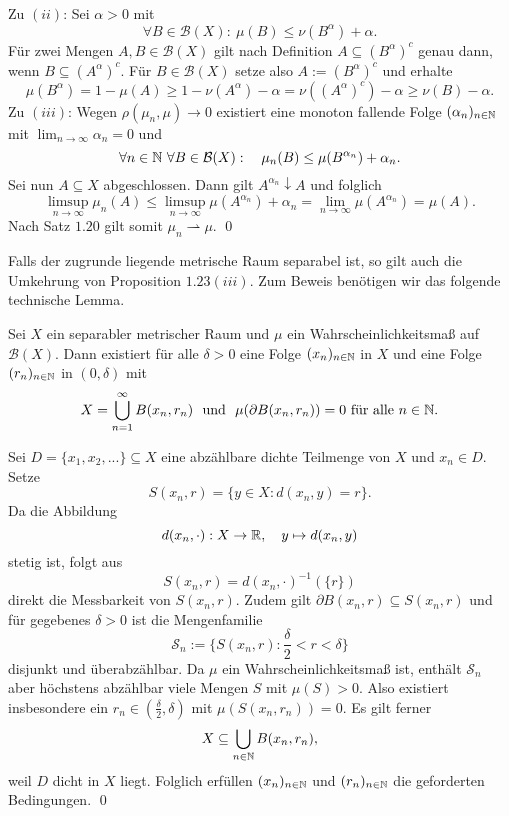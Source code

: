 \begin{proof*}
$$    $$
    Zu $(ii)$: Sei $\alpha > 0$ mit 
    $$
        \forall B \in \mathcal{B}(X): \ \mu(B) \leq \nu(B^{\alpha}) + \alpha.
    $$
    Für zwei Mengen $A,B \in \mathcal{B}(X)$ gilt nach Definition $A \subseteq (B^{\alpha})^c$ genau dann, wenn $B \subseteq (A^{\alpha})^c$. 
    Für $B \in \mathcal{B}(X)$ setze also $A:=(B^{\alpha})^c$ und erhalte 
    $$ 
        \mu(B^{\alpha}) = 1 - \mu(A) \geq 1 - \nu(A^{\alpha}) - \alpha = \nu((A^{\alpha})^c) - \alpha \geq \nu(B) - \alpha. 
    $$
    Zu $(iii)$: Wegen $\rho(\mu_n, \mu) \to 0$ existiert eine monoton fallende Folge $(\alpha_n)_{n \in \mathbb{N}}$ mit $\lim_{n \to \infty}\alpha_n = 0$ und 
    $$
        \forall n \in \mathbb{N} \ \forall B \in \mathcal{B}(X): \quad \mu_n(B) \leq \mu(B^{\alpha_n}) + \alpha_n. 
    $$
    Sei nun $A \subseteq X$ abgeschlossen. Dann gilt $A^{\alpha_n} \downarrow A$ und folglich
    $$
        \limsup_{n \to \infty} \mu_n(A) \leq \limsup_{n \to \infty} \mu(A^{\alpha_n}) + \alpha_n = \lim_{n \to \infty} \mu(A^{\alpha_n}) = \mu(A). 
    $$
    Nach Satz $1.20$ gilt somit $\mu_n \rightharpoonup \mu$. 
    \qed
\end{proof*}
Falls der zugrunde liegende metrische Raum separabel ist, so gilt auch die Umkehrung von Proposition $1.23(iii)$. Zum Beweis benötigen wir das folgende technische Lemma. 
\begin{lemma}
    Sei $X$ ein separabler metrischer Raum und $\mu$ ein Wahrscheinlichkeitsmaß auf $\mathcal{B}(X)$. Dann existiert für alle $\delta > 0$ eine Folge $(x_n)_{n \in \mathbb{N}}$ in $X$ und eine Folge $(r_n)_{n \in \mathbb{N}}$ in $(0, \delta)$ mit 
         $$
         X = \bigcup_{n=1}^{\infty}B(x_n, r_n) \ \text{ und } \ \mu(\partial B(x_n, r_n)) = 0 \text{ für alle }n \in \N.
         $$  
\end{lemma}
\begin{proof*}%
    Sei $D = \{x_1, x_2,... \} \subseteq X$ eine abzählbare dichte Teilmenge von $X$ und $x_n \in D$. Setze 
    $$
        S(x_n,r) = \{y \in X: d(x_n,y) = r\}.
    $$
    Da die Abbildung 
    $$
        d(x_n, \cdot): X \to \mathbb{R}, \quad y \mapsto d(x_n,y)
    $$
    stetig ist, folgt aus 
    $$
        S(x_n, r) = d(x_n, \cdot)^{-1}(\{r\})
    $$
    direkt die Messbarkeit von $S(x_n, r)$. 
    Zudem gilt $\partial B(x_n,r) \subseteq S(x_n,r)$ und für gegebenes $\delta > 0$ ist die Mengenfamilie
    $$
        \mathcal{S}_n := \{S(x_n,r) : \frac{\delta}{2} < r < \delta \}
    $$
    disjunkt und überabzählbar. Da $\mu$ ein Wahrscheinlichkeitsmaß ist, enthält $\mathcal{S}_n$ aber höchstens abzählbar viele Mengen $S$ mit $\mu(S) > 0$. 
    Also existiert insbesondere ein $r_n \in (\frac{\delta}{2}, \delta)$ mit $\mu(S(x_n,r_n)) = 0$. Es gilt ferner
    $$
        X \subseteq \bigcup_{n \in  \mathbb{N}}B(x_n, r_n),
    $$
    weil $D$ dicht in $X$ liegt. Folglich erfüllen $(x_n)_{n \in \mathbb{N}}$ und $(r_n)_{n \in \mathbb{N}}$ die geforderten Bedingungen. \qed
\end{proof*}

